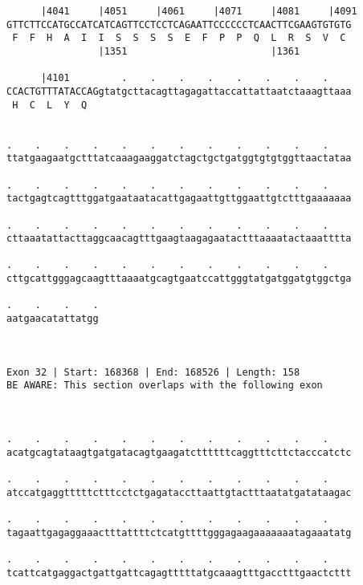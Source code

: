 \documentclass{article}
\begin{document}
\begin{Verbatim}
      |4041     |4051     |4061     |4071     |4081     |4091
GTTCTTCCATGCCATCATCAGTTCCTCCTCAGAATTCCCCCCTCAACTTCGAAGTGTGTG
 F  F  H  A  I  I  S  S  S  S  E  F  P  P  Q  L  R  S  V  C 
                |1351                         |1361         
  
      |4101         .    .    .    .    .    .    .    .    
CCACTGTTTATACCAGgtatgcttacagttagagattaccattattaatctaaagttaaa
 H  C  L  Y  Q                                              
                                                            
  
.    .    .    .    .    .    .    .    .    .    .    .    
ttatgaagaatgctttatcaaagaaggatctagctgctgatggtgtgtggttaactataa
                                                            
.    .    .    .    .    .    .    .    .    .    .    .    
tactgagtcagtttggatgaataatacattgagaattgttggaattgtctttgaaaaaaa
                                                            
.    .    .    .    .    .    .    .    .    .    .    .    
cttaaatattacttaggcaacagtttgaagtaagagaatactttaaaatactaaatttta
                                                            
.    .    .    .    .    .    .    .    .    .    .    .    
cttgcattgggagcaagtttaaaatgcagtgaatccattgggtatgatggatgtggctga
                                                            
.    .    .    .
aatgaacatattatgg
                
                
 
Exon 32 | Start: 168368 | End: 168526 | Length: 158
BE AWARE: This section overlaps with the following exon



.    .    .    .    .    .    .    .    .    .    .    .    
acatgcagtataagtgatgatacagtgaagatcttttttcaggtttcttctacccatctc
                                                            
.    .    .    .    .    .    .    .    .    .    .    .    
atccatgaggtttttctttcctctgagataccttaattgtactttaatatgatataagac
                                                            
.    .    .    .    .    .    .    .    .    .    .    .    
tagaattgagaggaaactttattttctcatgttttgggagaagaaaaaaatagaaatatg
                                                            
.    .    .    .    .    .    .    .    .    .    .    .    
tcattcatgaggactgattgattcagagtttttatgcaaagtttgacctttgaactcttt
                                                            

\end{Verbatim}
\end{document}
